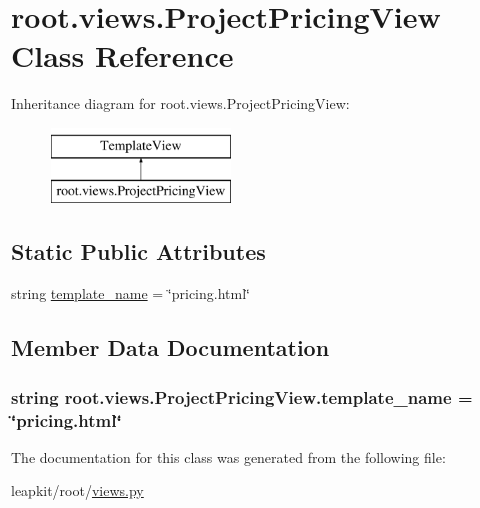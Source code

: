 \hypertarget{classroot_1_1views_1_1_project_pricing_view}{\section{root.\-views.\-Project\-Pricing\-View Class Reference}
\label{classroot_1_1views_1_1_project_pricing_view}
}
Inheritance diagram for root.\-views.\-Project\-Pricing\-View\-:\begin{figure}[H]
\begin{center}
\leavevmode
\includegraphics[height=2.000000cm]{classroot_1_1views_1_1_project_pricing_view}
\end{center}
\end{figure}
\subsection*{Static Public Attributes}
\begin{DoxyCompactItemize}
\item 
string \hyperlink{classroot_1_1views_1_1_project_pricing_view_ab681728e1f54ff9d55e986d99c0daee6}{template\-\_\-name} = \char`\"{}pricing.\-html\char`\"{}
\end{DoxyCompactItemize}


\subsection{Member Data Documentation}
\hypertarget{classroot_1_1views_1_1_project_pricing_view_ab681728e1f54ff9d55e986d99c0daee6}{
\subsubsection[{template\-\_\-name}]{\setlength{\rightskip}{0pt plus 5cm}string root.\-views.\-Project\-Pricing\-View.\-template\-\_\-name = \char`\"{}pricing.\-html\char`\"{}\hspace{0.3cm}{\ttfamily [static]}}}\label{classroot_1_1views_1_1_project_pricing_view_ab681728e1f54ff9d55e986d99c0daee6}


The documentation for this class was generated from the following file\-:\begin{DoxyCompactItemize}
\item 
leapkit/root/\hyperlink{root_2views_8py}{views.\-py}\end{DoxyCompactItemize}
